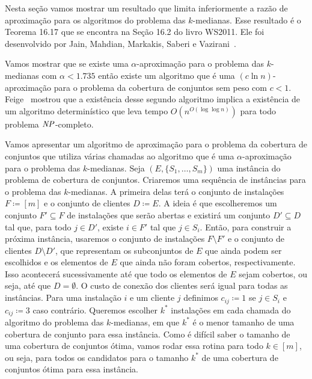 Nesta seção vamos mostrar um resultado que limita inferiormente a razão de aproximação para os algoritmos do problema das $k$-medianas. Esse resultado é o Teorema 16.17 que se encontra na Seção 16.2 do livro WS2011. Ele foi desenvolvido por Jain, Mahdian, Markakis, Saberi e Vazirani~\cite{jain2002greedy}.

Vamos mostrar que se existe uma $\alpha$-aproximação para o problema das $k$-medianas com $\alpha < 1.735$ então existe um algoritmo que é uma $(c \ln n)$-aproximação para o problema da cobertura de conjuntos sem peso com $c<1$. 
Feige~\cite{Feige98} mostrou que a existência desse segundo algoritmo implica a existência de um algoritmo determinístico que leva tempo $O(n^{O(\log\log n)})$ para todo problema $\mathit{NP}$-completo.

Vamos apresentar um algoritmo de aproximação para o problema da cobertura de conjuntos que utiliza várias chamadas ao algoritmo que é uma $\alpha$-aproximação para o problema das $k$-medianas. 
Seja $(E,\{S_1,\ldots,S_m\})$ uma instância do problema de cobertura de conjuntos. Criaremos uma sequência de instâncias para o problema das $k$-medianas. 
A primeira delas terá o conjunto de instalações $F \coloneqq [m]$ e o conjunto de clientes $D \coloneqq E$. 
A ideia é que escolheremos um conjunto $F' \subseteq F$ de instalações que serão abertas e existirá um conjunto $D' \subseteq D$ tal que, para todo $j \in D'$, existe $i \in F'$ tal que $j \in S_i$. 
Então, para construir a próxima instância, usaremos o conjunto de instalações $F \setminus F'$ e o conjunto de clientes $D \setminus D'$, que representam os subconjuntos de $E$ que ainda podem ser escolhidos e os elementos de $E$ que ainda não foram cobertos, respectivamente.
Isso acontecerá sucessivamente até que todo os elementos de $E$ sejam cobertos, ou seja, até que $D = \emptyset$.
O custo de conexão dos clientes será igual para todas as instâncias. Para uma instalação $i$ e um cliente $j$ definimos $c_{ij}\coloneqq 1$ se $j \in S_i$ e $c_{ij} \coloneqq 3$ caso contrário.
Queremos escolher $k^*$ instalações em cada chamada do algoritmo do problema das $k$-medianas, em que $k^*$ é o menor tamanho de uma cobertura de conjunto para essa instância. Como é difícil saber o tamanho de uma cobertura de conjuntos ótima, vamos rodar essa rotina para todo $k \in [m]$, ou seja, para todos os candidatos para o tamanho $k^*$ de uma cobertura de conjuntos ótima para essa instância.

